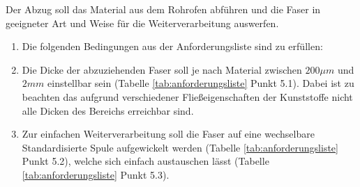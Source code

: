 Der Abzug soll das Material aus dem Rohrofen abführen und die Faser in geeigneter Art und Weise für die Weiterverarbeitung auswerfen.
 \vspace{2mm}
\begin{enumerate}
    \item[]Die folgenden Bedingungen aus der Anforderungsliste sind zu erfüllen: \vspace{2mm}
    \item Die Dicke der abzuziehenden Faser soll je nach Material zwischen $200\mu m$ und  $ 2mm$ einstellbar sein (Tabelle \ref{tab:anforderungsliste} Punkt 5.1). Dabei ist zu beachten das aufgrund verschiedener Fließeigenschaften der Kunststoffe nicht alle Dicken des Bereichs erreichbar sind.
    \item Zur einfachen Weiterverarbeitung soll die Faser auf eine wechselbare Standardisierte Spule aufgewickelt werden (Tabelle \ref{tab:anforderungsliste} Punkt 5.2), welche sich einfach austauschen lässt (Tabelle \ref{tab:anforderungsliste} Punkt 5.3).
\end{enumerate}



